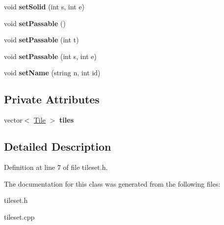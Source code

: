 \begin{DoxyCompactItemize}
\item 
void {\bfseries set\+Solid} (int s, int e)\hypertarget{classTileset_a6d40a14146a3dedd0217a412a66f4c9a}{}\label{classTileset_a6d40a14146a3dedd0217a412a66f4c9a}

\item 
void {\bfseries set\+Passable} ()\hypertarget{classTileset_a9fc3756317f238121769629ea20a9849}{}\label{classTileset_a9fc3756317f238121769629ea20a9849}

\item 
void {\bfseries set\+Passable} (int t)\hypertarget{classTileset_a231401092d65e28b7dea12e97e3232ad}{}\label{classTileset_a231401092d65e28b7dea12e97e3232ad}

\item 
void {\bfseries set\+Passable} (int s, int e)\hypertarget{classTileset_a84b12096b06c7162ca4bb9058a232d21}{}\label{classTileset_a84b12096b06c7162ca4bb9058a232d21}

\item 
void {\bfseries set\+Name} (string n, int id)\hypertarget{classTileset_ad5f3a60a84cec25c6e11856a7cd36d84}{}\label{classTileset_ad5f3a60a84cec25c6e11856a7cd36d84}

\end{DoxyCompactItemize}
\subsection*{Private Attributes}
\begin{DoxyCompactItemize}
\item 
vector$<$ \hyperlink{classTile}{Tile} $>$ {\bfseries tiles}\hypertarget{classTileset_adeb7a1446a0f6d7ac4bf09602fe81c3f}{}\label{classTileset_adeb7a1446a0f6d7ac4bf09602fe81c3f}

\end{DoxyCompactItemize}


\subsection{Detailed Description}


Definition at line 7 of file tileset.\+h.



The documentation for this class was generated from the following files\+:\begin{DoxyCompactItemize}
\item 
tileset.\+h\item 
tileset.\+cpp\end{DoxyCompactItemize}
